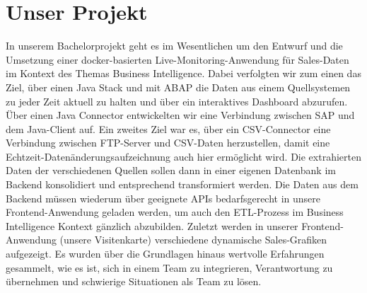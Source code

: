 \section*{Unser Projekt}
In unserem Bachelorprojekt geht es im Wesentlichen um den Entwurf und die Umsetzung einer docker-basierten Live-Monitoring-Anwendung für Sales-Daten im Kontext des Themas Business Intelligence.
\newline
\newline
Dabei verfolgten wir zum einen das Ziel, über einen Java Stack und mit ABAP die Daten aus einem Quellsystemen zu jeder Zeit aktuell zu halten und über ein interaktives Dashboard abzurufen. Über einen Java Connector entwickelten wir eine Verbindung zwischen SAP und dem Java-Client auf. Ein zweites Ziel war es, über ein CSV-Connector eine Verbindung zwischen FTP-Server und CSV-Daten herzustellen, damit eine Echtzeit-Datenänderungsaufzeichnung auch hier ermöglicht wird.
\newline
Die extrahierten Daten der verschiedenen Quellen sollen dann in einer eigenen Datenbank im Backend konsolidiert und entsprechend transformiert werden.
\newline
\newline
Die Daten aus dem Backend müssen wiederum über geeignete APIs bedarfsgerecht in unsere Frontend-Anwendung geladen werden, um auch den ETL-Prozess im Business Intelligence Kontext gänzlich abzubilden.
\newline
\newline
Zuletzt werden in unserer Frontend-Anwendung (unsere Visitenkarte) verschiedene dynamische Sales-Grafiken aufgezeigt.
\newline
Es wurden über die Grundlagen hinaus wertvolle Erfahrungen gesammelt, wie es ist, sich in einem Team zu integrieren, Verantwortung zu übernehmen und schwierige Situationen als Team zu lösen.

